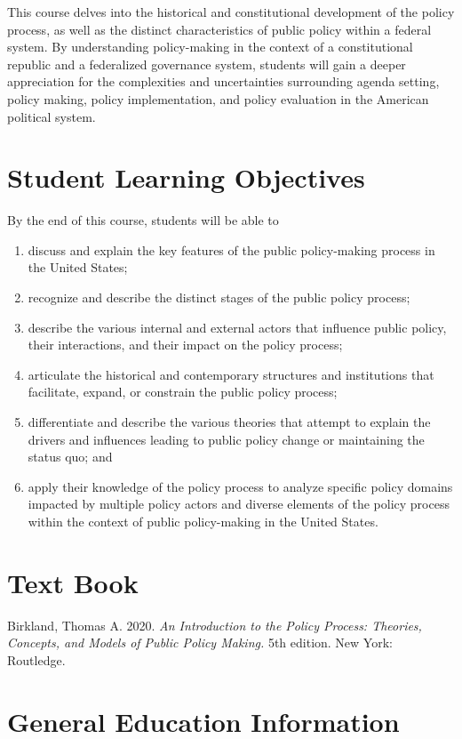 \documentclass[12pt, letterpaper]{article}
\begin{document}
	This course delves into the historical and constitutional development of the policy process, as well as the distinct characteristics of public policy within a federal system. By understanding policy-making in the context of a constitutional republic and a federalized governance system, students will gain a deeper appreciation for the complexities and uncertainties surrounding agenda setting, policy making, policy implementation, and policy evaluation in the American political system.

\section*{Student Learning Objectives}

By the end of this course, students will be able to

\begin{enumerate}
	\item discuss and explain the key features of the public policy-making process in the United States;
	\item recognize and describe the distinct stages of the public policy process;
	\item describe the various internal and external actors that influence public policy, their interactions, and their impact on the policy process;
	\item articulate the historical and contemporary structures and institutions that facilitate, expand, or constrain the public policy process;
	\item differentiate and describe the various theories that attempt to explain the drivers and influences leading to public policy change or maintaining the status quo; and
	\item apply their knowledge of the policy process to analyze specific policy domains impacted by multiple policy actors and diverse elements of the policy process within the context of public policy-making in the United States.
\end{enumerate}

\section*{Text Book}

Birkland, Thomas A. 2020. \emph{An Introduction to the Policy Process: Theories, Concepts, and Models of Public Policy Making.} 5th edition. New York: Routledge.

\section*{General Education Information}
\end{document}

